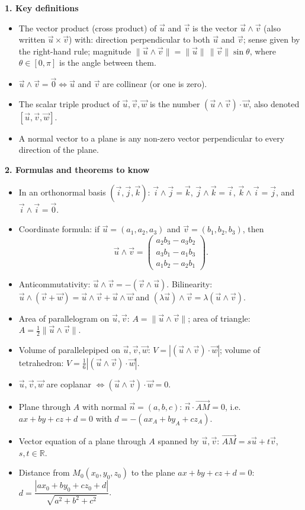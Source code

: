 \documentclass[11pt]{article}
\newcommand{\cle}[1]{{\popxbold\color{popdark}#1}}
\begin{document}
\begin{bilan}

\textbf{1. Key definitions}
\begin{itemize}
\item The \cle{vector product} (cross product) of $\vec{u}$ and $\vec{v}$ is the vector $\vec{u}\wedge\vec{v}$ (also written $\vec{u}\times\vec{v}$) with: direction perpendicular to both $\vec{u}$ and $\vec{v}$; sense given by the \cle{right-hand rule}; magnitude $\|\vec{u}\wedge\vec{v}\|=\|\vec{u}\|\,\|\vec{v}\|\sin\theta$, where $\theta\in[0,\pi]$ is the angle between them.
\item $\vec{u}\wedge\vec{v}=\vec{0}\iff \vec{u}$ and $\vec{v}$ are \cle{collinear} (or one is zero).
\item The \cle{scalar triple product} of $\vec{u},\vec{v},\vec{w}$ is the number $(\vec{u}\wedge\vec{v})\cdot\vec{w}$, also denoted $[\vec{u},\vec{v},\vec{w}]$.
\item A \cle{normal vector} to a plane is any non-zero vector perpendicular to every direction of the plane.
\end{itemize}

\textbf{2. Formulas and theorems to know}
\begin{itemize}
\item In an orthonormal basis $(\vec{i},\vec{j},\vec{k})$: $\vec{i}\wedge\vec{j}=\vec{k}$, $\vec{j}\wedge\vec{k}=\vec{i}$, $\vec{k}\wedge\vec{i}=\vec{j}$, and $\vec{i}\wedge\vec{i}=\vec{0}$.
\item Coordinate formula: if $\vec{u}=(a_1,a_2,a_3)$ and $\vec{v}=(b_1,b_2,b_3)$, then
\[ \vec{u}\wedge\vec{v}=\begin{pmatrix} a_2b_3-a_3b_2\\ a_3b_1-a_1b_3\\ a_1b_2-a_2b_1 \end{pmatrix}. \]
\item \cle{Anticommutativity}: $\vec{u}\wedge\vec{v}=-(\vec{v}\wedge\vec{u})$. \cle{Bilinearity}: $\vec{u}\wedge(\vec{v}+\vec{w})=\vec{u}\wedge\vec{v}+\vec{u}\wedge\vec{w}$ and $(\lambda\vec{u})\wedge\vec{v}=\lambda(\vec{u}\wedge\vec{v})$.
\item Area of parallelogram on $\vec{u},\vec{v}$: $A=\|\vec{u}\wedge\vec{v}\|$; area of triangle: $A=\tfrac12\|\vec{u}\wedge\vec{v}\|$.
\item Volume of parallelepiped on $\vec{u},\vec{v},\vec{w}$: $V=|(\vec{u}\wedge\vec{v})\cdot\vec{w}|$; volume of tetrahedron: $V=\tfrac16|(\vec{u}\wedge\vec{v})\cdot\vec{w}|$.
\item $\vec{u},\vec{v},\vec{w}$ are \cle{coplanar} $\iff (\vec{u}\wedge\vec{v})\cdot\vec{w}=0$.
\item Plane through $A$ with normal $\vec{n}=(a,b,c)$: $\vec{n}\cdot\overrightarrow{AM}=0$, i.e. $ax+by+cz+d=0$ with $d=-(ax_A+by_A+cz_A)$.
\item Vector equation of a plane through $A$ spanned by $\vec{u},\vec{v}$: $\overrightarrow{AM}=s\vec{u}+t\vec{v}$, $s,t\in\mathbb{R}$.
\item Distance from $M_0(x_0,y_0,z_0)$ to the plane $ax+by+cz+d=0$: $d=\dfrac{|ax_0+by_0+cz_0+d|}{\sqrt{a^2+b^2+c^2}}$.
\end{itemize}


\end{bilan}
\end{document}
